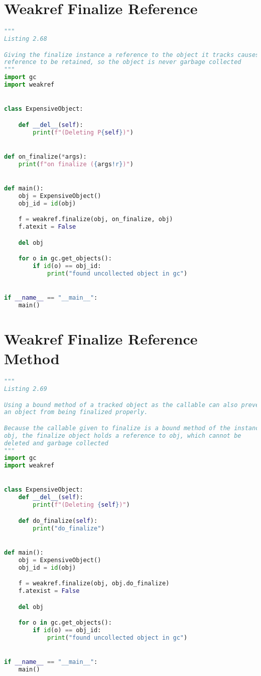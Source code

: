 \documentclass[a4paper,landscape]{report}
\begin{document}
\section{Weakref Finalize Reference}
\begin{lstlisting}[language=Python]
"""
Listing 2.68

Giving the finalize instance a reference to the object it tracks causes a
reference to be retained, so the object is never garbage collected
"""
import gc
import weakref


class ExpensiveObject:

    def __del__(self):
        print(f"(Deleting P{self})")


def on_finalize(*args):
    print(f"on finalize ({args!r})")


def main():
    obj = ExpensiveObject()
    obj_id = id(obj)

    f = weakref.finalize(obj, on_finalize, obj)
    f.atexit = False

    del obj

    for o in gc.get_objects():
        if id(o) == obj_id:
            print("found uncollected object in gc")


if __name__ == "__main__":
    main()

\end{lstlisting}
\section{Weakref Finalize Reference Method}
\begin{lstlisting}[language=Python]
"""
Listing 2.69

Using a bound method of a tracked object as the callable can also prevent
an object from being finalized properly.

Because the callable given to finalize is a bound method of the instance
obj, the finalize object holds a reference to obj, which cannot be
deleted and garbage collected
"""
import gc
import weakref


class ExpensiveObject:
    def __del__(self):
        print(f"(Deleting {self})")

    def do_finalize(self):
        print("do_finalize")


def main():
    obj = ExpensiveObject()
    obj_id = id(obj)

    f = weakref.finalize(obj, obj.do_finalize)
    f.atexist = False

    del obj

    for o in gc.get_objects():
        if id(o) == obj_id:
            print("found uncollected object in gc")


if __name__ == "__main__":
    main()

\end{lstlisting}
\end{document}
